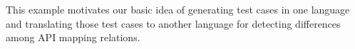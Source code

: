 This example motivates our basic idea of generating test cases in one language and translating those test cases to another language for detecting differences among API mapping relations. %


%
%
%
%
%
%
